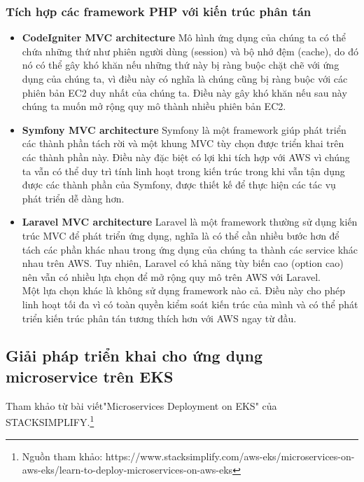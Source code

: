 \subsubsection{Tích hợp các framework PHP với kiến trúc phân tán}
    \begin{itemize}
        \item \textbf{CodeIgniter MVC architecture}
        \newline
        Mô hình ứng dụng của chúng ta có thể chứa những thứ như phiên người dùng (session) và bộ nhớ đệm (cache), do đó nó có thể gây khó khăn nếu những thứ này bị ràng buộc chặt chẽ với ứng dụng của chúng ta, vì điều này có nghĩa là chúng cũng bị ràng buộc với các phiên bản EC2 duy nhất của chúng ta. Điều này gây khó khăn nếu sau này chúng ta muốn mở rộng quy mô thành nhiều phiên bản EC2.
        \item \textbf{Symfony MVC architecture}
        \newline
        Symfony là một framework giúp phát triển các thành phần tách rời và một khung MVC tùy chọn được triển khai trên các thành phần này. Điều này đặc biệt có lợi khi tích hợp với AWS vì chúng ta vẫn có thể duy trì tính linh hoạt trong kiến trúc trong khi vẫn tận dụng được các thành phần của Symfony, được thiết kế để thực hiện các tác vụ phát triển dễ dàng hơn.
        \item \textbf{Laravel MVC architecture}
        \newline
        Laravel là một framework thường sử dụng kiến trúc MVC để phát triển ứng dụng, nghĩa là có thể cần nhiều bước hơn để tách các phần khác nhau trong ứng dụng của chúng ta thành các service khác nhau trên AWS. Tuy nhiên, Laravel có khả năng tùy biến cao (option cao) nên vẫn có nhiều lựa chọn để mở rộng quy mô trên AWS với Laravel.\\[0.5cm]
        Một lựa chọn khác là không sử dụng framework nào cả. Điều này cho phép linh hoạt tối đa vì có toàn quyền kiểm soát kiến trúc của mình và có thể phát triển kiến trúc phân tán tương thích hơn với AWS ngay từ đầu.
    \end{itemize}
\subsection{Giải pháp triển khai cho ứng dụng microservice trên EKS}
\noindent Tham khảo từ bài viết"Microservices Deployment on EKS" của STACKSIMPLIFY.\footnote{Nguồn tham khảo: https://www.stacksimplify.com/aws-eks/microservices-on-aws-eks/learn-to-deploy-microservices-on-aws-eks}
